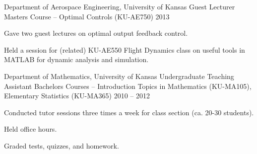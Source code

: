 \begin{cventries}
\cvteachentry
  	{Department of Aerospace Engineering, University of Kansas} %
  	{Guest Lecturer} %
    {Masters Course -- Optimal Controls (KU-AE750)} %
    {2013} %
    {
      \begin{cvitems} %
        \item Gave two guest lectures on optimal output feedback control. %
		\item Held a session for (related) KU-AE550 Flight Dynamics class on useful tools in MATLAB for dynamic analysis and simulation.
      \end{cvitems}
    } %
    {} %
    {\showteachingdescriptions}

\cvteachentry
  	{Department of Mathematics, University of Kansas} %
  	{Undergraduate Teaching Assistant} %
    {Bachelors Courses -- Introduction Topics in Mathematics (KU-MA105), Elementary Statistics (KU-MA365)} %
    {2010 – 2012} %
    {
      \begin{cvitems} %
        \item Conducted tutor sessions three times a week for class section (ca. 20-30 students).
		\item Held office hours.
		\item Graded tests, quizzes, and homework.
      \end{cvitems}
    } %
    {} %
    {\showteachingdescriptions}

\end{cventries}

